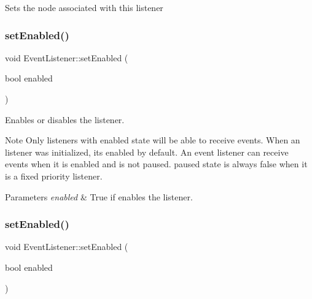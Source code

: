 Sets the node associated with this listener \mbox{\label{classEventListener_a962aaf9f2de557fbb38e457569bca352}} 
\subsubsection{\texorpdfstring{set\+Enabled()}{setEnabled()}\hspace{0.1cm}{\footnotesize\ttfamily [1/2]}}
{\footnotesize\ttfamily void Event\+Listener\+::set\+Enabled (\begin{DoxyParamCaption}\item[{bool}]{enabled }\end{DoxyParamCaption})\hspace{0.3cm}{\ttfamily [inline]}}

Enables or disables the listener. \begin{DoxyNote}{Note}
Only listeners with {\ttfamily enabled} state will be able to receive events. When an listener was initialized, it\textquotesingle{}s enabled by default. An event listener can receive events when it is enabled and is not paused. paused state is always false when it is a fixed priority listener.
\end{DoxyNote}

\begin{DoxyParams}{Parameters}
{\em enabled} & True if enables the listener. \\
\hline
\end{DoxyParams}
\mbox{\label{classEventListener_a962aaf9f2de557fbb38e457569bca352}} 
\subsubsection{\texorpdfstring{set\+Enabled()}{setEnabled()}\hspace{0.1cm}{\footnotesize\ttfamily [2/2]}}
{\footnotesize\ttfamily void Event\+Listener\+::set\+Enabled (\begin{DoxyParamCaption}\item[{bool}]{enabled }\end{DoxyParamCaption})\hspace{0.3cm}{\ttfamily [inline]}}

